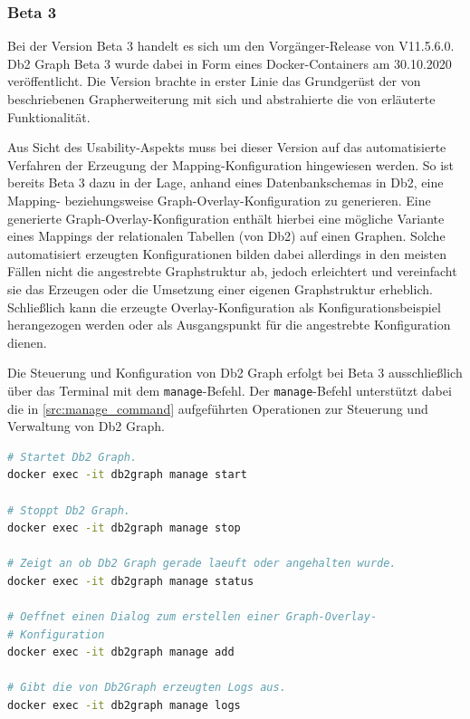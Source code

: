 \subsubsection{Beta 3}

Bei der Version Beta 3 handelt es sich um den Vorgänger-Release von V11.5.6.0. Db2 Graph Beta 3 wurde dabei in Form eines Docker-Containers am 30.10.2020 veröffentlicht. Die Version brachte in erster Linie das Grundgerüst der von  beschriebenen Grapherweiterung mit sich und abstrahierte die von  erläuterte Funktionalität. 

Aus Sicht des Usability-Aspekts muss bei dieser Version auf das automatisierte Verfahren der Erzeugung der Mapping-Konfiguration hingewiesen werden. So ist bereits Beta 3 dazu in der Lage, anhand eines Datenbankschemas in Db2, eine Mapping- beziehungsweise Graph-Overlay-Konfiguration zu generieren. Eine generierte Graph-Overlay-Konfiguration enthält hierbei eine mögliche Variante eines Mappings der relationalen Tabellen (von Db2) auf einen Graphen. Solche automatisiert erzeugten Konfigurationen bilden dabei allerdings in den meisten Fällen nicht die angestrebte Graphstruktur ab, jedoch erleichtert und vereinfacht sie das Erzeugen oder die Umsetzung einer eigenen Graphstruktur erheblich. Schließlich kann die erzeugte Overlay-Konfiguration als Konfigurationsbeispiel herangezogen werden oder als Ausgangspunkt für die angestrebte Konfiguration dienen. 

Die Steuerung und Konfiguration von Db2 Graph erfolgt bei Beta 3 ausschließlich über das Terminal mit dem \texttt{manage}-Befehl. Der \texttt{manage}-Befehl unterstützt dabei die in \autoref{src:manage_command} aufgeführten Operationen zur Steuerung und Verwaltung von Db2 Graph. 

\begin{lstlisting}[label=src:manage_command,caption={Beispiel Steuerung und Verwaltung von  Db2 Graph Beta 3},language=BASH]
# Startet Db2 Graph.
docker exec -it db2graph manage start

# Stoppt Db2 Graph.
docker exec -it db2graph manage stop

# Zeigt an ob Db2 Graph gerade laeuft oder angehalten wurde.
docker exec -it db2graph manage status

# Oeffnet einen Dialog zum erstellen einer Graph-Overlay-
# Konfiguration
docker exec -it db2graph manage add

# Gibt die von Db2Graph erzeugten Logs aus.
docker exec -it db2graph manage logs
\end{lstlisting}

